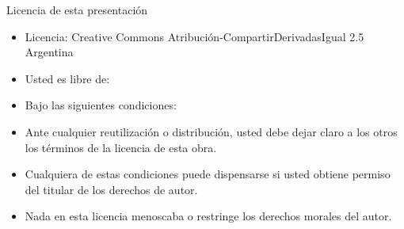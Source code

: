 \documentclass{beamer}
\begin{document}
\begin{frame}{Licencia de esta presentación}
  \begin{tiny}
  \begin{itemize}
    \item Licencia: Creative Commons Atribución-CompartirDerivadasIgual 2.5 Argentina

    \item Usted es libre de:
      \begin{itemize}
      \end{itemize}

    \item Bajo las siguientes condiciones:
      \begin{itemize}
      \end{itemize}

    \item Ante cualquier reutilización o distribución, usted debe dejar
      claro a los otros los términos de la licencia de esta obra.
    \item Cualquiera de estas condiciones puede dispensarse si usted
      obtiene permiso del titular de los derechos de autor.
    \item Nada en esta licencia menoscaba o restringe los derechos
      morales del autor.
  \end{itemize}
  \end{tiny}
\end{frame}
\end{document}
